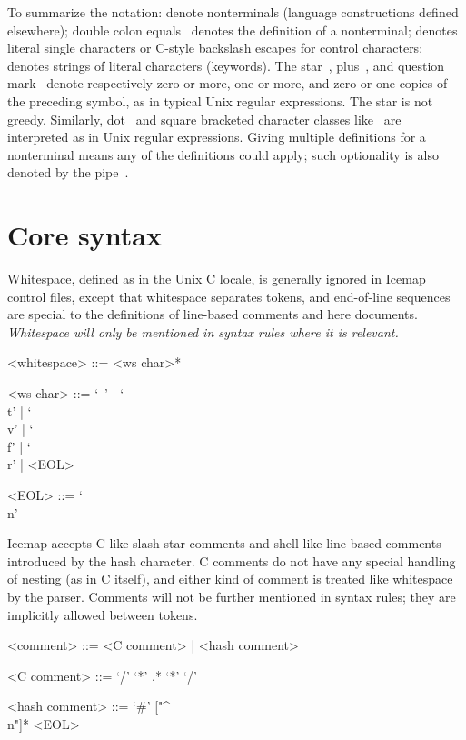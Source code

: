 \documentclass{mitsuba}
\begin{document}
To  summarize the notation:
 denote nonterminals (language
constructions defined elsewhere); double colon equals~\syntax{::=} denotes
the definition of a nonterminal;  denotes
literal single characters or C-style
backslash escapes for control characters;
 denotes strings of literal characters
(keywords).  The star~\syntax{*}, plus~\syntax{+}, and question
mark~ denote respectively zero or more, one or more, and zero or one
copies of the preceding symbol, as in typical Unix regular expressions.
The star is not greedy.
Similarly, dot~ and square bracketed character classes
like~\syntax{["a-z"]} are interpreted as in Unix regular expressions.
Giving multiple definitions for a nonterminal means any of the definitions
could apply; such optionality is also denoted by the pipe~\syntax{|}.

\section{Core syntax}

Whitespace, defined as in the Unix C locale, is generally
ignored in Icemap control files, except that whitespace separates tokens,
and end-of-line sequences are special to the definitions of line-based
comments and here documents.  \emph{Whitespace will only be mentioned in
syntax rules where it is relevant.}

\begin{grammar}
<whitespace> ::= <ws char>*

<ws char> ::= `\ ' | `\\t' | `\\v' | `\\f' | `\\r' | <EOL>

<EOL> ::= `\\n'
\end{grammar}

Icemap accepts C-like slash-star comments and shell-like
line-based comments introduced by the hash character.  C comments do not
have any special handling of nesting (as in C itself), and either kind of
comment is treated like whitespace by the parser.  Comments will not be
further mentioned in syntax rules; they are implicitly allowed between
tokens.

\begin{grammar}
<comment> ::= <C comment> | <hash comment>

<C comment> ::= `/' `*' .* `*' `/'

<hash comment> ::= `#' ["^\\n"]* <EOL>
\end{grammar}
\end{document}
